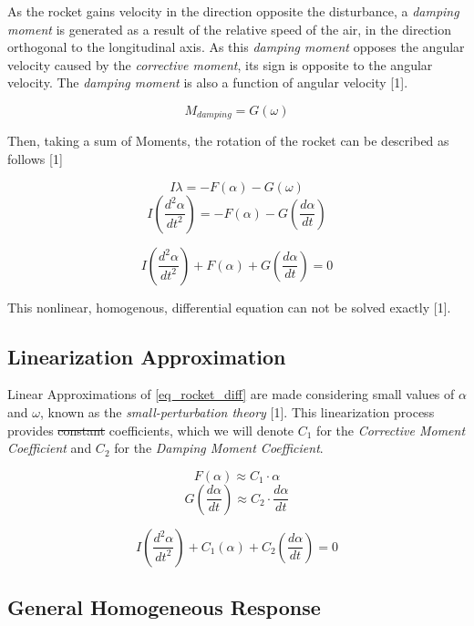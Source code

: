 \documentclass[]{article}
\begin{document}
As the rocket gains velocity in the direction opposite the disturbance,
a \emph{damping moment} is generated as a result of the relative speed
of the air, in the direction orthogonal to the longitudinal axis. As
this \emph{damping moment} opposes the angular velocity caused by the
\emph{corrective moment}, its sign is opposite to the angular velocity.
The \emph{damping moment} is also a function of angular velocity
{[}1{]}.

\begin{equation}
M_{damping} = G (\omega)
\end{equation}

Then, taking a sum of Moments, the rotation of the rocket can be
described as follows {[}1{]}

\[
I \lambda = -F(\alpha) - G(\omega) 
\] \[
I \left( \dfrac{d^2\alpha}{dt^2} \right) = -F(\alpha) - G \left(\dfrac{d\alpha}{dt} \right) 
\]

\begin{equation}
\label{eq_rocket_diff}
I \left( \dfrac{d^2\alpha}{dt^2} \right) + F(\alpha) + G \left(\dfrac{d\alpha}{dt} \right) = 0
\end{equation}

This nonlinear, homogenous, differential equation can not be solved
exactly {[}1{]}.

\subsection{Linearization
Approximation}\label{linearization-approximation}

Linear Approximations of \ref{eq_rocket_diff} are made considering small
values of \(\alpha\) and \(\omega\), known as the
\emph{small-perturbation theory} {[}1{]}. This linearization process
provides \sout{constant} coefficients, which we will denote \(C_1\) for
the \emph{Corrective Moment Coefficient} and \(C_2\) for the
\emph{Damping Moment Coefficient}.

\[
F(\alpha) \approx C_1 \cdot \alpha 
\] \[
G \left(\dfrac{d\alpha}{dt} \right) \approx C_2 \cdot \dfrac{d\alpha}{dt} 
\]

\begin{equation}
\label{eq_rocket_diff_linearized}
I \left( \dfrac{d^2\alpha}{dt^2} \right) + C_1 (\alpha) + C_2 \left(\dfrac{d\alpha}{dt} \right) = 0
\end{equation}

\subsection{General Homogeneous
Response}\label{general-homogeneous-response}
\end{document}
